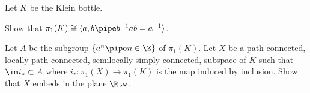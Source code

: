 Let $K$ be the Klein bottle.
\begin{alist}
\item Show that $\pi_1(K)\cong \langle a,b \pipe
b^{-1}ab=a^{-1}\rangle$.
\item Let $A$ be the subgroup $\{a^n \pipe n\in \Z\}$ of
$\pi_1(K)$. Let $X$ be a path connected, locally path connected,
semilocally simply connected, subspace of $K$ such that $\im
i_{*}\subset A$ where $i_{*}:\pi_1(X)\rightarrow \pi_1(K)$ is the map
induced by inclusion. Show that $X$ embeds in the plane $\Rtw$.
\end{alist}
